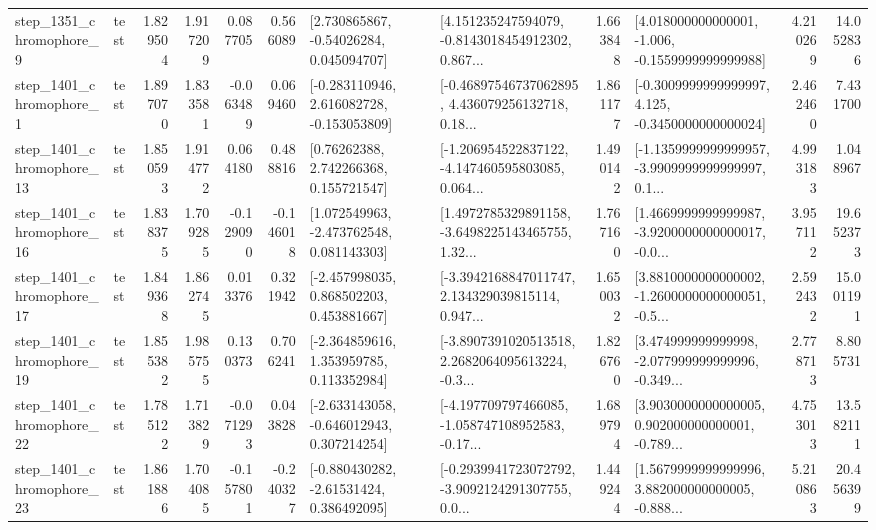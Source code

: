 \begin{tabular}{llrrrrllrlrr}
  step\_1351\_chromophore\_9 &      test &      1.829504 &    1.917209 &      0.087705 &  0.566089 &     [2.730865867, -0.54026284, 0.045094707] &  [4.151235247594079, -0.8143018454912302, 0.867... &       1.663848 &   [4.018000000000001, -1.006, -0.1559999999999988] &            4.210269 &         14.052836 \\
  step\_1401\_chromophore\_1 &      test &      1.897070 &    1.833581 &     -0.063489 &  0.069460 &   [-0.283110946, 2.616082728, -0.153053809] &  [-0.46897546737062895, 4.436079256132718, 0.18... &       1.861177 &  [-0.3009999999999997, 4.125, -0.3450000000000024] &            2.462460 &          7.431700 \\
 step\_1401\_chromophore\_13 &      test &      1.850593 &    1.914772 &      0.064180 &  0.488816 &      [0.76262388, 2.742266368, 0.155721547] &  [-1.206954522837122, -4.147460595803085, 0.064... &       1.490142 &  [-1.1359999999999957, -3.9909999999999997, 0.1... &            4.993183 &          1.048967 \\
 step\_1401\_chromophore\_16 &      test &      1.838375 &    1.709285 &     -0.129090 & -0.146018 &    [1.072549963, -2.473762548, 0.081143303] &  [1.4972785329891158, -3.6498225143465755, 1.32... &       1.767160 &  [1.4669999999999987, -3.9200000000000017, -0.0... &            3.957112 &         19.652373 \\
 step\_1401\_chromophore\_17 &      test &      1.849368 &    1.862745 &      0.013376 &  0.321942 &    [-2.457998035, 0.868502203, 0.453881667] &  [-3.3942168847011747, 2.134329039815114, 0.947... &       1.650032 &  [3.8810000000000002, -1.2600000000000051, -0.5... &            2.592432 &         15.001191 \\
 step\_1401\_chromophore\_19 &      test &      1.855382 &    1.985755 &      0.130373 &  0.706241 &    [-2.364859616, 1.353959785, 0.113352984] &  [-3.8907391020513518, 2.2682064095613224, -0.3... &       1.826760 &  [3.474999999999998, -2.077999999999996, -0.349... &            2.778713 &          8.805731 \\
 step\_1401\_chromophore\_22 &      test &      1.785122 &    1.713829 &     -0.071293 &  0.043828 &   [-2.633143058, -0.646012943, 0.307214254] &  [-4.197709797466085, -1.058747108952583, -0.17... &       1.689794 &  [3.9030000000000005, 0.902000000000001, -0.789... &            4.753013 &         13.582111 \\
 step\_1401\_chromophore\_23 &      test &      1.861886 &    1.704085 &     -0.157801 & -0.240327 &    [-0.880430282, -2.61531424, 0.386492095] &  [-0.2939941723072792, -3.9092124291307755, 0.0... &       1.449244 &  [1.5679999999999996, 3.882000000000005, -0.888... &            5.210863 &         20.456399 \\

\end{tabular}

